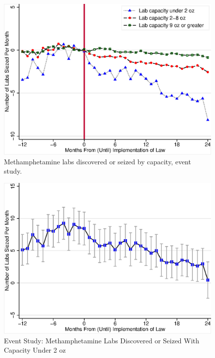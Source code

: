 \documentclass[
  11pt,
]{article}
\begin{document}
\begin{figure}[H]
 \centering
 \includegraphics{event-study.eps}
 \caption{Methamphetamine labs discovered or seized by capacity, event study.}
\label{event-study}
\end{figure}

\begin{figure}[H]
 \centering
 \includegraphics{confidence-interval-plot-for-cap_under_2_oz.eps}
 \caption{Event Study: Methamphetamine Labs Discovered or Seized With Capacity Under 2 oz}
\label{ci-cap2}
\end{figure}
\end{document}
